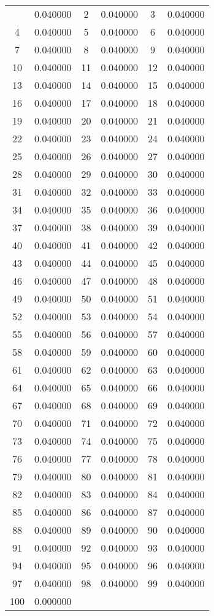 \documentclass[12pt]{article}
\begin{document}
\begin{longtable}{@{}cc|cc|cc@{}}
\bottomrule
\endlastfoot
1 & 0.040000 & 2 & 0.040000 & 3 & 0.040000 \\
4 & 0.040000 & 5 & 0.040000 & 6 & 0.040000 \\
7 & 0.040000 & 8 & 0.040000 & 9 & 0.040000 \\
10 & 0.040000 & 11 & 0.040000 & 12 & 0.040000 \\
13 & 0.040000 & 14 & 0.040000 & 15 & 0.040000 \\
16 & 0.040000 & 17 & 0.040000 & 18 & 0.040000 \\
19 & 0.040000 & 20 & 0.040000 & 21 & 0.040000 \\
22 & 0.040000 & 23 & 0.040000 & 24 & 0.040000 \\
25 & 0.040000 & 26 & 0.040000 & 27 & 0.040000 \\
28 & 0.040000 & 29 & 0.040000 & 30 & 0.040000 \\
31 & 0.040000 & 32 & 0.040000 & 33 & 0.040000 \\
34 & 0.040000 & 35 & 0.040000 & 36 & 0.040000 \\
37 & 0.040000 & 38 & 0.040000 & 39 & 0.040000 \\
40 & 0.040000 & 41 & 0.040000 & 42 & 0.040000 \\
43 & 0.040000 & 44 & 0.040000 & 45 & 0.040000 \\
46 & 0.040000 & 47 & 0.040000 & 48 & 0.040000 \\
49 & 0.040000 & 50 & 0.040000 & 51 & 0.040000 \\
52 & 0.040000 & 53 & 0.040000 & 54 & 0.040000 \\
55 & 0.040000 & 56 & 0.040000 & 57 & 0.040000 \\
58 & 0.040000 & 59 & 0.040000 & 60 & 0.040000 \\
61 & 0.040000 & 62 & 0.040000 & 63 & 0.040000 \\
64 & 0.040000 & 65 & 0.040000 & 66 & 0.040000 \\
67 & 0.040000 & 68 & 0.040000 & 69 & 0.040000 \\
70 & 0.040000 & 71 & 0.040000 & 72 & 0.040000 \\
73 & 0.040000 & 74 & 0.040000 & 75 & 0.040000 \\
76 & 0.040000 & 77 & 0.040000 & 78 & 0.040000 \\
79 & 0.040000 & 80 & 0.040000 & 81 & 0.040000 \\
82 & 0.040000 & 83 & 0.040000 & 84 & 0.040000 \\
85 & 0.040000 & 86 & 0.040000 & 87 & 0.040000 \\
88 & 0.040000 & 89 & 0.040000 & 90 & 0.040000 \\
91 & 0.040000 & 92 & 0.040000 & 93 & 0.040000 \\
94 & 0.040000 & 95 & 0.040000 & 96 & 0.040000 \\
97 & 0.040000 & 98 & 0.040000 & 99 & 0.040000 \\
100 & 0.000000 &  &  &  &  \\

\end{longtable}
\end{document}
